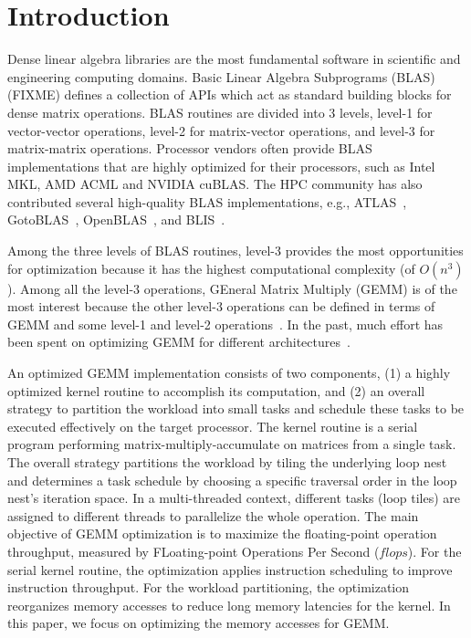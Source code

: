 \section{Introduction}\label{sec:intro}
Dense linear algebra libraries are the most fundamental software in
scientific and engineering computing domains.
Basic Linear Algebra Subprograms (BLAS) (FIXME) defines a collection
of APIs which act as standard building blocks for dense matrix operations.
BLAS routines are divided into 3 levels,
level-1 for vector-vector operations,
level-2 for matrix-vector operations,
and level-3 for matrix-matrix operations.
Processor vendors often provide BLAS implementations
that are highly optimized for their processors,
such as Intel MKL, AMD ACML and NVIDIA cuBLAS.
The HPC community has also contributed several high-quality
BLAS implementations, e.g., ATLAS~\cite{atlas},
GotoBLAS~\cite{gotoblas}, OpenBLAS~\cite{openblas},
and BLIS~\cite{blis,blisport}.

Among the three levels of BLAS routines, level-3 provides the most opportunities
for optimization because it has the highest computational complexity (of $O(n^3)$).
Among all the level-3 operations, GEneral Matrix Multiply (GEMM) is
of the most interest because the 
other level-3 operations can be defined
in terms of GEMM and some level-1 and level-2 operations~\cite{gemmbased1}.
In the past, much effort has been spent on optimizing GEMM for different
architectures~\cite{Liu2012,Wang2015,Volkov:2008,Cui11,blispar}.

An optimized GEMM implementation consists of two components,
(1) a highly optimized kernel routine to accomplish its
computation, and
(2) an overall strategy to partition the workload into small tasks
and schedule these tasks to be executed effectively on the target processor.
The kernel routine is a serial program performing matrix-multiply-accumulate
on matrices from a single task.
The overall strategy partitions the workload by tiling 
the underlying loop nest
and determines a task schedule by choosing a specific traversal order
in the loop nest's iteration space.
In a multi-threaded context, different tasks (loop tiles) are assigned to
different threads to parallelize the whole operation.
The main objective of GEMM optimization is to
maximize the floating-point
operation throughput, measured by FLoating-point Operations Per Second ($flops$).
For the serial kernel routine, the optimization applies
instruction scheduling to improve instruction throughput.
For the workload partitioning, the optimization 
reorganizes memory accesses to reduce long memory latencies for
the kernel.
In this paper, we focus on optimizing the memory accesses for GEMM.

